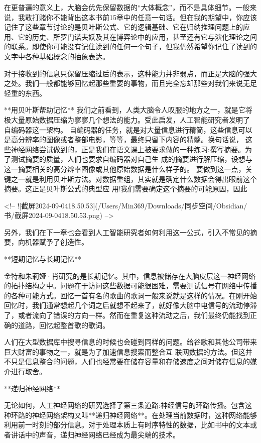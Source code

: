 在更普遍的意义上，大脑会优先保留数据的“大体概念”，而不是具体细节。一般来说，我敢打赌你不能背出这本书前15章中的任意一句话。但在我的期望中，你应该记住了这些章节讨论的是贝叶斯公式、它的逻辑基础、它在归纳推理问题上的应用、它的历史、所罗门诺夫妖及其在博弈论中的应用，甚至还有它与演化理论之间的联系。即使你可能没有记住读到的任何一个句子，但我仍然希望你记住了读到的文字中各种基础概念的抽象表达。

对于接收到的信息只保留压缩过后的表示，这种能力并非弱点，而正是大脑的强大之处。我们一般都能够回忆起那些重要的事物，而且完全忘却那些对我们来说无足轻重的东西。

**用贝叶斯帮助记忆**
我们之前看到，人类大脑令人叹服的地方之一，就是它将极大量原始数据压缩为寥寥几个想法的能力。受此启发，人工智能研究者发明了
自编码器这一架构。
自编码器的任务，就是对大量信息进行精简，这些信息可以是高分辨率的图像或者整部电影，等等，最终只留下内容的精髓。换句话说，
这些神经网络尝试做到的，正是我们在语文课上被要求做的一种练习:撰写摘要。为了测试摘要的质量，人们也要求自编码器对自己生
成的摘要进行解压缩，设想与这一摘要相关的高分辨率图像或其他原始数据是什么样子的。
要做到这一点，关键之一就是利用贝叶斯方法。对数据重组，其实就是确定什么数据会得出眼前这个摘要。这正是贝叶斯公式的典型应
用!我们需要确定这个摘要的可能原因，因此

<!-- ![截屏2024-09-0418.50.53](/Users/Min369/Downloads/同步空间/Obsidian/书/截屏2024-09-0418.50.53.png) -->

另外，我们在下一章也会看到人工智能研究者如何利用这一公式，引入不常见的摘要，向机器赋予了创造性。

**短期记忆与长期记忆**

金特和朱莉娅·肖研究的是长期记忆。其中，信息被储存在大脑皮层这一神经网络的拓扑结构之中。问题在于访问这些数据可能很困难，需要测试信号在网络中传播的各种可能方式。回忆一首有名的歌曲的歌词一般来说就是这样的情况。在刚开始回忆时，我们通常想起几个词之后就想不起来了，就好像大脑中电信号的流动停滞了，或者流向了错误的方向一样。然而在重复这种流动之后，我们最终仍能找到正确的道路，回忆起整首歌的歌词。

人们在大型数据库中搜寻信息的时候也会碰到同样的问题。给谷歌和其他公司带来巨大财富的事物之一，就是为了加速信息搜索而整合互
联网数据的方法。但这并不只是信息整合的问题，人们也经常要在储存容量和存储速度之间对储存信息的媒介进行取舍。

**递归神经网络**

无论如何，人工神经网络的研究选择了第三条道路:神经信号的环路传播。包含这种环路的神经网络架构又叫**递归神经网络**。在处理当前数据时，这种网络能够利用前一时刻的部分信息。对于处理本质上有时序特性的数据，比如书中的文本或者讲话中的声音，递归神经网络已经成为最尖端的技术。

